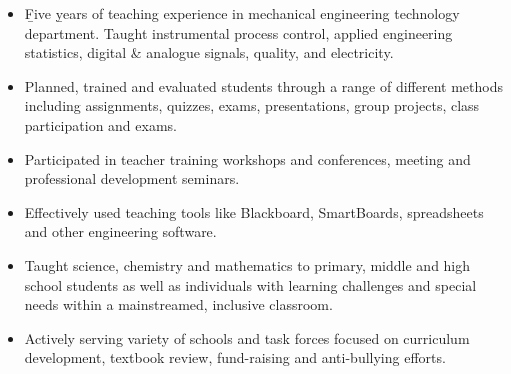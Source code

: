 \documentclass[10pt,a4paper]{altacv}
\begin{document}

\begin{fullwidth}
\makecvheader
\end{fullwidth}


\begin{itemize}
\item \b Five \b years of teaching experience in mechanical engineering technology department. Taught instrumental process control, applied engineering statistics, digital \& analogue signals, quality, and electricity. 
\item Planned, trained and evaluated students through a range of different methods including assignments, quizzes, exams, presentations, group projects, class participation and exams.
\item Participated in teacher training workshops and conferences, meeting and professional development seminars.
\item Effectively used teaching tools like Blackboard, SmartBoards, spreadsheets and
other engineering software. 

\end{itemize}

\divider

\begin{itemize}
\item Taught science, chemistry and mathematics to primary, middle and high school students as well as individuals with learning challenges and special needs within a mainstreamed, inclusive classroom.
\item Actively serving variety of schools and task forces focused on curriculum development, textbook review, fund-raising and anti-bullying efforts.

\end{itemize}
\end{document}
